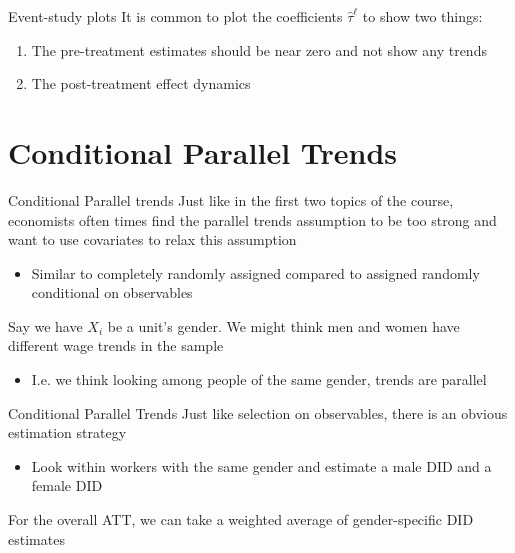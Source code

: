 \documentclass[aspectratio=169,t,11pt,table]{beamer}
\begin{document}
\begin{frame}{Event-study plots}
  It is common to plot the coefficients $\hat{\tau}^\ell$ to show two things:
  \begin{enumerate}
    \item The pre-treatment estimates should be near zero and not show any trends
    
    \item The post-treatment effect dynamics
  \end{enumerate}
\end{frame}




\section{Conditional Parallel Trends}

\begin{frame}{Conditional Parallel trends}
  Just like in the first two topics of the course, economists often times find the parallel trends assumption to be too strong and want to use covariates to relax this assumption
  \begin{itemize}
    \item Similar to completely randomly assigned compared to assigned randomly conditional on observables
  \end{itemize}

  \pause
  \bigskip
  Say we have $X_i$ be a unit's gender. We might think men and women have different wage trends in the sample
  \begin{itemize}
    \item I.e. we think looking among people of the same gender, trends are parallel
  \end{itemize}
\end{frame}

\begin{frame}{Conditional Parallel Trends}
  Just like selection on observables, there is an obvious estimation strategy
  \begin{itemize}
    \item Look within workers with the same gender and estimate a male DID and a female DID
  \end{itemize}

  \bigskip
  For the overall ATT, we can take a weighted average of gender-specific DID estimates
\end{frame}
\end{document}
